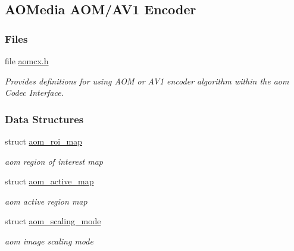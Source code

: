 \hypertarget{group__aom__encoder}{}\subsection{A\+O\+Media A\+O\+M/\+A\+V1 Encoder}
\label{group__aom__encoder}
\subsubsection*{Files}
\begin{DoxyCompactItemize}
\item 
file \hyperlink{aomcx_8h}{aomcx.\+h}
\begin{DoxyCompactList}\small\item\em Provides definitions for using A\+OM or A\+V1 encoder algorithm within the aom Codec Interface. \end{DoxyCompactList}\end{DoxyCompactItemize}
\subsubsection*{Data Structures}
\begin{DoxyCompactItemize}
\item 
struct \hyperlink{structaom__roi__map}{aom\+\_\+roi\+\_\+map}
\begin{DoxyCompactList}\small\item\em aom region of interest map \end{DoxyCompactList}\item 
struct \hyperlink{structaom__active__map}{aom\+\_\+active\+\_\+map}
\begin{DoxyCompactList}\small\item\em aom active region map \end{DoxyCompactList}\item 
struct \hyperlink{structaom__scaling__mode}{aom\+\_\+scaling\+\_\+mode}
\begin{DoxyCompactList}\small\item\em aom image scaling mode \end{DoxyCompactList}\end{DoxyCompactItemize}
